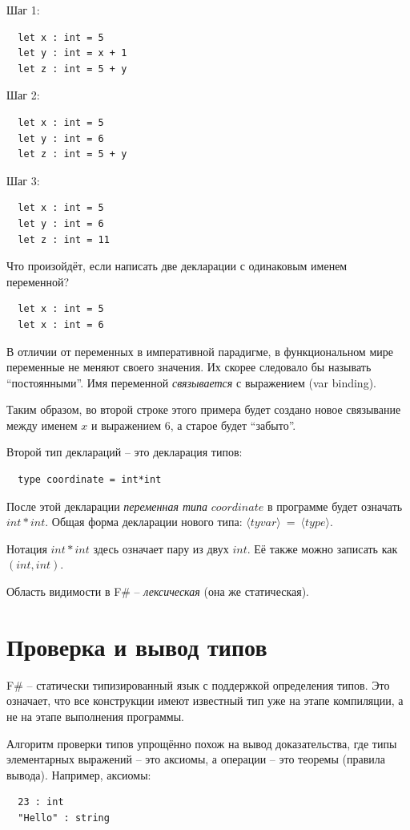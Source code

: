\documentclass[a4paper,11pt]{article}
\begin{document}
Шаг 1:
\begin{lstlisting}
  let x : int = 5
  let y : int = x + 1
  let z : int = 5 + y
\end{lstlisting}

Шаг 2:
\begin{lstlisting}
  let x : int = 5
  let y : int = 6
  let z : int = 5 + y
\end{lstlisting}

Шаг 3:
\begin{lstlisting}
  let x : int = 5
  let y : int = 6
  let z : int = 11
\end{lstlisting}

Что произойдёт, если написать две декларации с одинаковым именем переменной?
\begin{lstlisting}
  let x : int = 5
  let x : int = 6
\end{lstlisting}

В отличии от переменных в императивной парадигме, в функциональном мире
переменные не меняют своего значения. Их скорее следовало бы называть
``постоянными''. Имя переменной \emph{связывается} с выражением (var binding).

Таким образом, во второй строке этого примера будет создано новое 
связывание между именем $x$ и выражением $6$, а старое будет ``забыто''.

Второй тип деклараций -- это декларация типов:
\begin{lstlisting}
  type coordinate = int*int
\end{lstlisting}

После этой декларации \emph{переменная типа} $coordinate$ в программе будет
означать $int * int$. Общая форма декларации нового типа: $\langle tyvar
\rangle~=~\langle type \rangle$.

Нотация $int * int$ здесь означает пару из двух $int$. Её также можно записать
как $(int, int)$.

Область видимости в F\# -- \emph{лексическая} (она же статическая). 

\section{Проверка и вывод типов}

F\# -- статически типизированный язык с поддержкой определения типов. Это 
означает, что все конструкции имеют известный тип уже на этапе компиляции, а не
на этапе выполнения программы.

Алгоритм проверки типов упрощённо похож на вывод доказательства, где типы
элементарных выражений -- это аксиомы, а операции -- это теоремы (правила 
вывода). Например, аксиомы:
\begin{lstlisting}
  23 : int
  "Hello" : string
\end{lstlisting}
\end{document}
